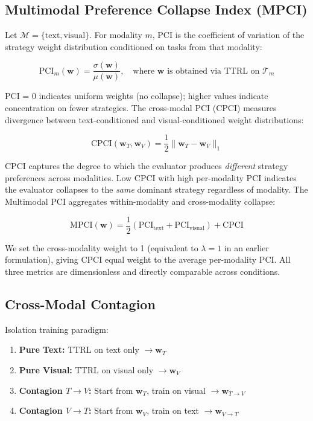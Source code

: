 \documentclass[11pt,a4paper]{article}
\begin{document}
\subsection{Multimodal Preference Collapse Index (MPCI)}
Let $\mathcal{M} = \{\text{text}, \text{visual}\}$. For modality $m$, PCI is the coefficient of variation of the strategy weight distribution conditioned on tasks from that modality:

\begin{equation}
\text{PCI}_m(\mathbf{w}) = \frac{\sigma(\mathbf{w})}{\mu(\mathbf{w})}, \quad \text{where } \mathbf{w} \text{ is obtained via TTRL on } \mathcal{T}_m
\end{equation}

PCI = 0 indicates uniform weights (no collapse); higher values indicate concentration on fewer strategies. The cross-modal PCI (CPCI) measures divergence between text-conditioned and visual-conditioned weight distributions:

\begin{equation}
\text{CPCI}(\mathbf{w}_T, \mathbf{w}_V) = \frac{1}{2} \|\mathbf{w}_T - \mathbf{w}_V\|_1
\end{equation}

CPCI captures the degree to which the evaluator produces \textit{different} strategy preferences across modalities. Low CPCI with high per-modality PCI indicates the evaluator collapses to the \textit{same} dominant strategy regardless of modality. The Multimodal PCI aggregates within-modality and cross-modality collapse:

\begin{equation}
\text{MPCI}(\mathbf{w}) = \frac{1}{2}\left(\text{PCI}_{\text{text}} + \text{PCI}_{\text{visual}}\right) + \text{CPCI}
\end{equation}

We set the cross-modality weight to 1 (equivalent to $\lambda=1$ in an earlier formulation), giving CPCI equal weight to the average per-modality PCI. All three metrics are dimensionless and directly comparable across conditions.

\subsection{Cross-Modal Contagion}
Isolation training paradigm:

\begin{enumerate}[leftmargin=*, label=\textbf{Phase \arabic*}:]
    \item \textbf{Pure Text:} TTRL on text only $\rightarrow \mathbf{w}_T$
    \item \textbf{Pure Visual:} TTRL on visual only $\rightarrow \mathbf{w}_V$
    \item \textbf{Contagion $T\to V$:} Start from $\mathbf{w}_T$, train on visual $\rightarrow \mathbf{w}_{T\to V}$
    \item \textbf{Contagion $V\to T$:} Start from $\mathbf{w}_V$, train on text $\rightarrow \mathbf{w}_{V\to T}$
\end{enumerate}
\end{document}
